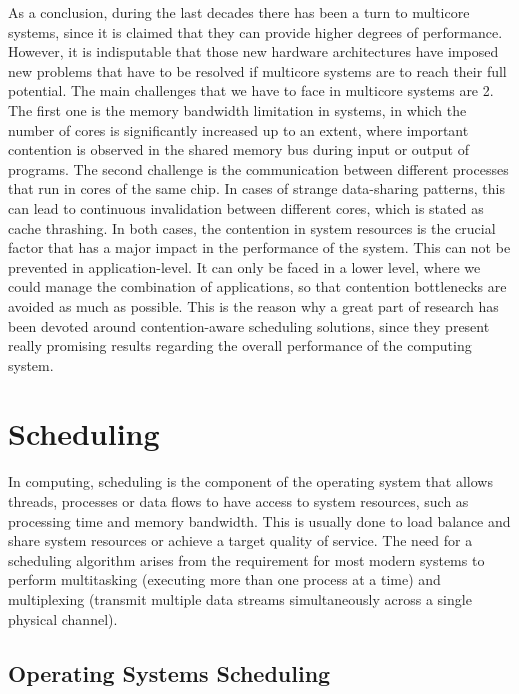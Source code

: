 \documentclass[diploma]{Styles/softlab-thesis}
\begin{document}
As a conclusion, during the last decades there has been a turn to multicore systems, since it is claimed that they can provide higher degrees of performance. However, it is indisputable that those new hardware architectures have imposed new problems that have to be resolved if multicore systems are to reach their full potential. The main challenges that we have to face in multicore systems are 2. The first one is the memory bandwidth limitation in systems, in which the number of cores is significantly increased up to an extent, where important contention is observed in the shared memory bus during input or output of programs. The second challenge is the communication between different processes that run in cores of the same chip. In cases of strange data-sharing patterns, this can lead to continuous invalidation between different cores, which is stated as cache thrashing. In both cases, the contention in system resources is the crucial factor that has a major impact in the performance of the system. This can not be prevented in application-level. It can only be faced in a lower level, where we could manage the combination of applications, so that contention bottlenecks are avoided as much as possible. This is the reason why a great part of research has been devoted around contention-aware scheduling solutions, since they present really promising results regarding the overall performance of the computing system.

\section{Scheduling}

In computing, scheduling is the component of the operating system that allows threads, processes or data flows to have access to system resources, such as processing time and memory bandwidth. This is usually done to load balance and share system resources or achieve a target quality of service. The need for a scheduling algorithm arises from the requirement for most modern systems to perform multitasking (executing more than one process at a time) and multiplexing (transmit multiple data streams simultaneously across a single physical channel).

\subsection{Operating Systems Scheduling}
\end{document}
